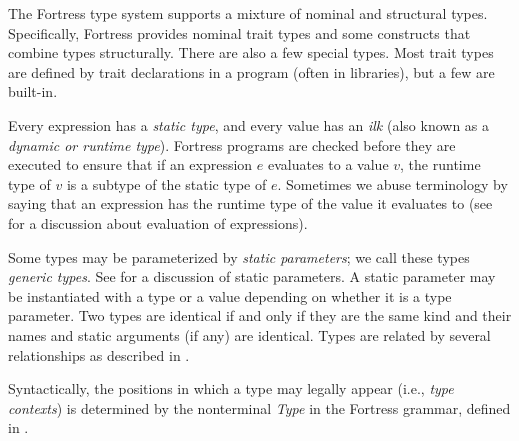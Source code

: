 %
%
%
%






The Fortress type system supports a mixture of nominal and structural types.
Specifically,
Fortress provides nominal trait types
and some constructs that combine types structurally.
There are also a few special types.
Most trait types are defined by trait declarations in a program 
(often in libraries), 
but a few are built-in.

Every expression has a \emph{static type},
and every value has an \emph{ilk}
(also known as a \emph{dynamic or runtime type}).
Fortress programs are checked before they are executed to ensure that if
an expression $e$ evaluates to a value $v$, the runtime type of $v$ is a
subtype of the static type of $e$.
Sometimes we abuse terminology by saying that
an expression has the runtime type of the value it evaluates to
(see  for a discussion about evaluation of expressions).

Some types may be parameterized by \emph{static parameters};
we call these types \emph{generic types}.
See  for a discussion of static parameters.
A static parameter may be instantiated with a type or a value
depending on whether it is a type parameter.
Two types are identical if and only if they are the same kind and
their names and static arguments (if any) are identical.
Types are related by several relationships as described in
.

Syntactically,
the positions in which a type may legally appear (i.e., \emph{type contexts})
is determined by the nonterminal \emph{Type} in the Fortress grammar,
defined in .


